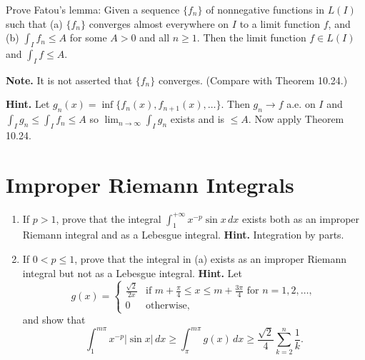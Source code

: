 \begin{problembox}
Prove Fatou's lemma: Given a sequence $\{f_n\}$ of nonnegative functions in $L(I)$ such that (a) $\{f_n\}$ converges almost everywhere on $I$ to a limit function $f$, and (b) $\int_I f_n \leq A$ for some $A > 0$ and all $n \geq 1$. Then the limit function $f \in L(I)$ and $\int_I f \leq A$.

\textbf{Note.} It is not asserted that $\{f_n\}$ converges. (Compare with Theorem 10.24.)

\textbf{Hint.} Let $g_n(x) = \inf \{f_n(x), f_{n+1}(x), \ldots\}$. Then $g_n \to f$ a.e. on $I$ and $\int_I g_n \leq \int_I f_n \leq A$ so $\lim_{n \to \infty} \int_I g_n$ exists and is $\leq A$. Now apply Theorem 10.24.
\end{problembox}

\section{Improper Riemann Integrals}

\begin{problembox}
\begin{enumerate}[label=(\alph*)]
    \item If $p > 1$, prove that the integral $\int_1^{+\infty} x^{-p} \sin x \, dx$ exists both as an improper Riemann integral and as a Lebesgue integral. \textbf{Hint.} Integration by parts.
    \item If $0 < p \leq 1$, prove that the integral in (a) exists as an improper Riemann integral but not as a Lebesgue integral. \textbf{Hint.} Let
    \[g(x) = 
    \begin{cases} 
    \frac{\sqrt{2}}{2x} & \text{if } m + \frac{\pi}{4} \leq x \leq m + \frac{3\pi}{4} \text{ for } n = 1, 2, \ldots, \\ 
    0 & \text{otherwise},
    \end{cases}\]
    and show that
    \[\int_{1}^{m\pi} x^{-p} |\sin x| \, dx \geq \int_{\pi}^{m\pi} g(x) \, dx \geq \frac{\sqrt{2}}{4} \sum_{k=2}^{n} \frac{1}{k}.\]
\end{enumerate}
\end{problembox}

